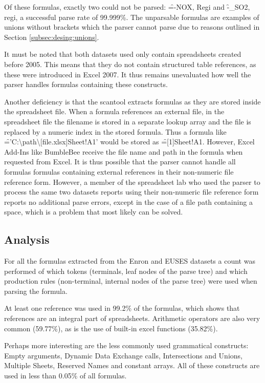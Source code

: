 Of these formulas, exactly two could not be parsed: \f{=-NOX, Regi} and \f{-_SO2, regi}, a successful parse rate of 99.999\%.
The unparsable formulas are examples of unions without brackets which the parser cannot parse due to reasons outlined in Section \ref{subsec:desing:unions}.
 
\newpage 
 
It must be noted that both datasets used only contain spreadsheets created before 2005.
This means that they do not contain structured table references, as these were introduced in Excel 2007.
It thus remains unevaluated how well the parser handles formulas containing these constructs.

Another deficiency is that the scantool extracts formulas as they are stored inside the spreadsheet file.
When a formula references an external file, in the spreadsheet file the filename is stored in a separate lookup array and the file is replaced by a numeric index in the stored formula.
Thus a formula like \f{='C:\textbackslash path\textbackslash [file.xlsx]Sheet!A1'} would be stored as \f{=[1]Sheet!A1}.
However, Excel Add-Ins like BumbleBee receive the file name and path in the formula when requested from Excel.
It is thus possible that the parser cannot handle all formulas formulas containing external references in their non-numeric file reference form.
However, a member of the spreadsheet lab who used the parser to process the same two datasets reports using their non-numeric file reference form reports no additional parse errors, except in the case of a file path containing a space, which is a problem that most likely can be solved.

\subsection{Analysis}

For all the formulas extracted from the Enron and EUSES datasets a count was performed of which tokens (terminals, leaf nodes of the parse tree) and which production rules (non-terminal, internal nodes of the parse tree) were used when parsing the formula.

At least one reference was used in 99.2\% of the formulas, which shows that references are an integral part of spreadsheets.
Arithmetic operators are also very common (59.77\%), as is the use of built-in excel functions (35.82\%).

Perhaps more interesting are the less commonly used grammatical constructs: Empty arguments, Dynamic Data Exchange calls, Intersections and Unions, Multiple Sheets, Reserved Names and constant arrays.
All of these constructs are used in less than 0.05\% of all formulas.

